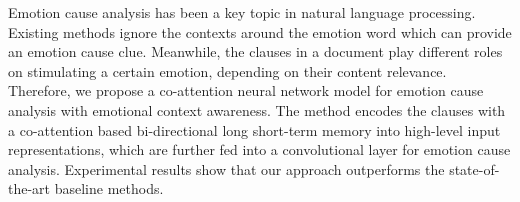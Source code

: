 Emotion cause analysis has been a key topic in natural language processing. Existing methods ignore the contexts around the emotion word which can provide an emotion cause clue. Meanwhile, the clauses in a document play different roles on stimulating a certain emotion, depending on their content relevance. Therefore, we propose a co-attention neural network model for emotion cause analysis with emotional context awareness. The method encodes the clauses with a co-attention based bi-directional long short-term memory into high-level input representations, which are further fed into a convolutional layer for emotion cause analysis. Experimental results show that our approach outperforms the state-of-the-art baseline methods.
